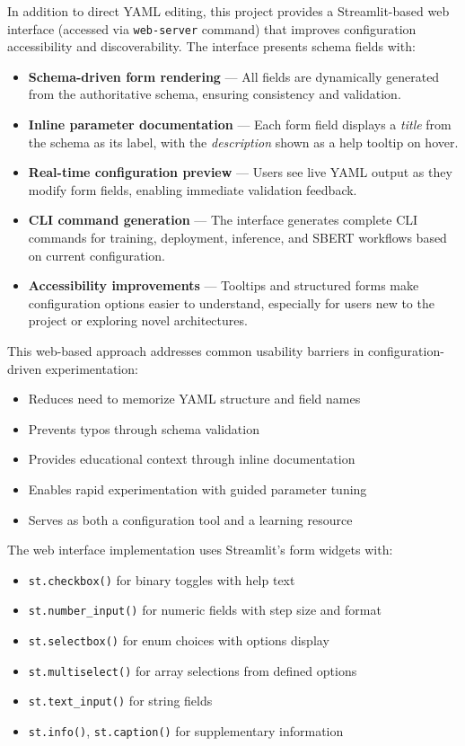 \documentclass[11pt,a4paper]{article}
\begin{document}
In addition to direct YAML editing, this project provides a Streamlit-based web interface (accessed via \texttt{web-server} command) that improves configuration accessibility and discoverability. The interface presents schema fields with:

\begin{itemize}[leftmargin=*]
    \item \textbf{Schema-driven form rendering} --- All fields are dynamically generated from the authoritative schema, ensuring consistency and validation.
    \item \textbf{Inline parameter documentation} --- Each form field displays a \emph{title} from the schema as its label, with the \emph{description} shown as a help tooltip on hover.
    \item \textbf{Real-time configuration preview} --- Users see live YAML output as they modify form fields, enabling immediate validation feedback.
    \item \textbf{CLI command generation} --- The interface generates complete CLI commands for training, deployment, inference, and SBERT workflows based on current configuration.
    \item \textbf{Accessibility improvements} --- Tooltips and structured forms make configuration options easier to understand, especially for users new to the project or exploring novel architectures.
\end{itemize}

This web-based approach addresses common usability barriers in configuration-driven experimentation:
\begin{itemize}[leftmargin=*]
    \item Reduces need to memorize YAML structure and field names
    \item Prevents typos through schema validation
    \item Provides educational context through inline documentation
    \item Enables rapid experimentation with guided parameter tuning
    \item Serves as both a configuration tool and a learning resource
\end{itemize}

The web interface implementation uses Streamlit's form widgets with:
\begin{itemize}[leftmargin=*]
    \item \texttt{st.checkbox()} for binary toggles with help text
    \item \texttt{st.number\_input()} for numeric fields with step size and format
    \item \texttt{st.selectbox()} for enum choices with options display
    \item \texttt{st.multiselect()} for array selections from defined options
    \item \texttt{st.text\_input()} for string fields
    \item \texttt{st.info()}, \texttt{st.caption()} for supplementary information
\end{itemize}
\end{document}
